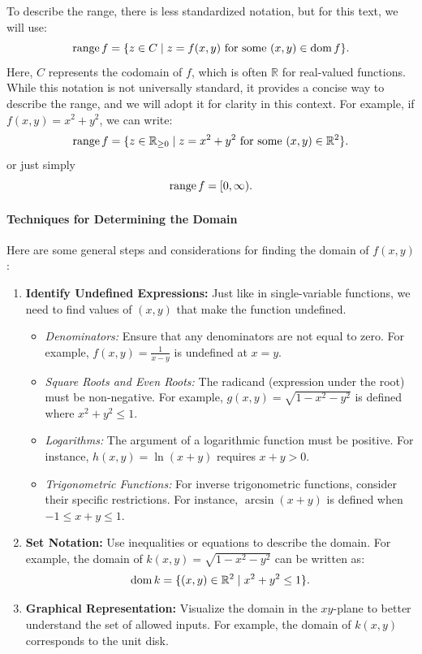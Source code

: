 \noindent To describe the range, there is less standardized notation, but for this text, we will use:
\[
\mathrm{range}\, f = \{z \in C \mid z = f(x, y) \text{ for some } (x, y) \in \mathrm{dom}\,f \}.
\]
Here, \( C \) represents the codomain of \( f \), which is often \( \mathbb{R} \) for real-valued functions. While this notation is not universally standard, it provides a concise way to describe the range, and we will adopt it for clarity in this context. For example, if \( f(x, y) = x^2 + y^2 \), we can write:
\[
\mathrm{range}\, f = \{z \in \mathbb{R}_{\geq 0} \mid z = x^2 + y^2 \text{ for some } (x, y) \in \mathbb{R}^2 \}.
\]
\noindent or just simply
\[
\mathrm{range}\, f = [0, \infty).
\]

\paragraph{Techniques for Determining the Domain}

Here are some general steps and considerations for finding the domain of \( f(x, y) \):

\begin{enumerate}
    \item \textbf{Identify Undefined Expressions:} Just like in single-variable functions, we need to find values of \( (x, y) \) that make the function undefined.
        \begin{itemize}
            \item \textit{Denominators:} Ensure that any denominators are not equal to zero. For example, \( f(x, y) = \frac{1}{x - y} \) is undefined at \( x = y \).
            \item \textit{Square Roots and Even Roots:} The radicand (expression under the root) must be non-negative. For example, \( g(x, y) = \sqrt{1 - x^2 - y^2} \) is defined where \( x^2 + y^2 \leq 1 \).
            \item \textit{Logarithms:} The argument of a logarithmic function must be positive. For instance, \( h(x, y) = \ln(x + y) \) requires \( x + y > 0 \).
            \item \textit{Trigonometric Functions:} For inverse trigonometric functions, consider their specific restrictions. For instance, \( \arcsin(x + y) \) is defined when \( -1 \leq x + y \leq 1 \).
        \end{itemize}
    \item \textbf{Set Notation:} Use inequalities or equations to describe the domain. For example, the domain of \( k(x, y) = \sqrt{1 - x^2 - y^2} \) can be written as:
    \[
    \mathrm{dom}\,k = \{(x, y) \in \mathbb{R}^2 \mid x^2 + y^2 \leq 1\}.
    \]
    \item \textbf{Graphical Representation:} Visualize the domain in the \( xy \)-plane to better understand the set of allowed inputs. For example, the domain of \( k(x, y) \) corresponds to the unit disk.
\end{enumerate}

